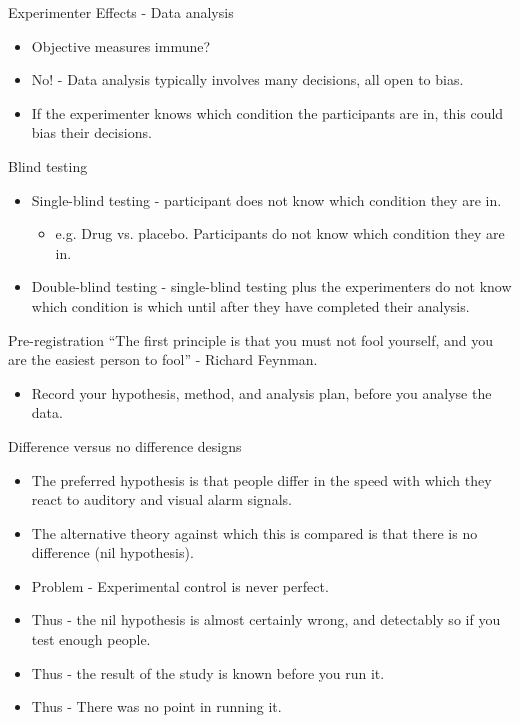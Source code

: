 \documentclass{beamer}
\begin{document}
\begin{frame}{Experimenter Effects - Data analysis  }
\begin{itemize}
\item Objective measures immune? 
\item No! - Data analysis typically involves many decisions, all open to bias. 
\item If the experimenter knows which condition the participants are in, this could bias their decisions.
\end{itemize}
\end{frame}

\begin{frame}{Blind testing}
\begin{itemize}
\item Single-blind testing - participant does not know which condition they are in. 
\begin{itemize}
\item e.g. Drug vs. placebo. Participants do not know which condition they are in. 
\end{itemize}
\item Double-blind testing - single-blind testing plus the experimenters do not know which condition is which until after they have completed their analysis.
\end{itemize}
\end{frame}

\begin{frame}{Pre-registration}
     ``The first principle is that you must not fool yourself, and you are the easiest person to fool'' - Richard Feynman.
\vspace{24pt}
  \begin{itemize}
  \item Record your hypothesis, method, and analysis plan, before you analyse the data.
\end{itemize}
\end{frame}


\begin{frame}{Difference versus no difference designs}
\begin{itemize}
\item The preferred hypothesis is that people differ in the speed with which they react to auditory and visual alarm signals.
\item The alternative theory against which this is compared is that there is no difference (nil hypothesis).
\item Problem - Experimental control is never perfect.
\item Thus - the nil hypothesis is almost certainly wrong, and detectably so if you test enough people.
\item Thus - the result of the study is known before you run it.
\item Thus - There was no point in running it.
\end{itemize}
\end{frame}
\end{document}
